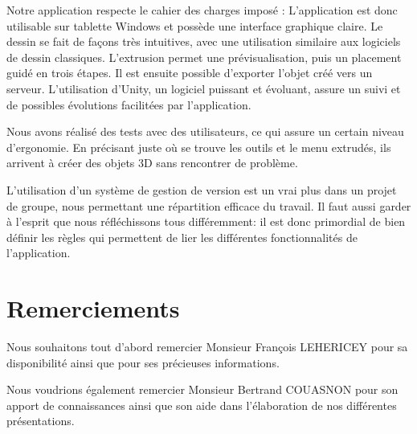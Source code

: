 \documentclass[a4paper,11pt]{article}
\begin{document}
		Notre application respecte le cahier des charges imposé :
		L'application est donc utilisable sur tablette Windows et possède une interface graphique claire. Le dessin se fait de façons très intuitives, avec une utilisation similaire aux logiciels de dessin classiques. L'extrusion permet une prévisualisation, puis un placement guidé en trois étapes. Il est ensuite possible d'exporter l'objet créé vers un serveur. L'utilisation d'Unity, un logiciel puissant et évoluant, assure un suivi et de possibles évolutions facilitées par l'application.
		
		Nous avons réalisé des tests avec des utilisateurs, ce qui assure un certain niveau d'ergonomie. En précisant juste où se trouve les outils et le menu extrudés, ils arrivent à créer des objets 3D sans rencontrer de problème.
		
		L'utilisation d'un système de gestion de version est un vrai plus dans un projet de groupe, nous permettant une répartition efficace du travail. Il faut aussi garder à l'esprit que nous réfléchissons tous différemment: il est donc primordial de bien définir les règles qui permettent de lier les différentes fonctionnalités de l'application.
		

	
	\section{Remerciements}
		Nous souhaitons tout d'abord remercier Monsieur François LEHERICEY pour sa disponibilité ainsi que pour ses précieuses informations.
		
		Nous voudrions également remercier Monsieur Bertrand COUASNON pour son apport de connaissances ainsi que son aide dans l'élaboration de nos différentes présentations.
		

\end{document}
